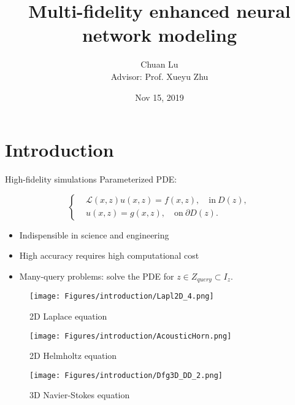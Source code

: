 \documentclass[10pt]{beamer}
\title{Multi-fidelity enhanced neural network modeling }
\date{Nov 15, 2019}
\author[Chuan Lu]{Chuan Lu \\[5pt]
Advisor: Prof. Xueyu Zhu}
\institute[AMCS]{Applied Mathematical and Computational Sciences, University of Iowa}
\begin{document}
\maketitle


\begin{frame}
\tableofcontents
\end{frame}

\section{Introduction}

\begin{frame}{High-fidelity simulations}
Parameterized PDE:
\nocite{maday2006reduced}
\nocite{hesthaven2018non}
\nocite{zhu2014computational}
\nocite{lu2019bifidelity}

$$
\left\{
\begin{aligned}
&\mathcal{L}(x, z)u(x, z) = f(x, z), \quad \text{in}\ D(z), \\ 
&u(x, z) = g(x, z), \quad \text{on}\ \partial D(z).
\end{aligned}
\right.
$$
\begin{itemize}
	\item Indispensible in science and engineering
	\item High accuracy requires high computational cost
	\item Many-query problems: solve the PDE for $z \in Z_{query} \subset I_{z} $.
\end{itemize}


\begin{figure}
\centering
  \begin{minipage}[t]{0.32\textwidth}
    \texttt{[image: Figures/introduction/Lapl2D\_4.png]}
    \footnotemark[1]
    \caption{2D Laplace equation}
  \end{minipage}
  \begin{minipage}[t]{0.32\textwidth}
    \texttt{[image: Figures/introduction/AcousticHorn.png]}
    \footnotemark[1]
    \caption{2D Helmholtz equation}
  \end{minipage}
  \begin{minipage}[t]{0.32\textwidth}
    \texttt{[image: Figures/introduction/Dfg3D\_DD\_2.png]}
    \footnotemark[1]
    \caption{3D Navier-Stokes equation}
  \end{minipage}
\end{figure}
\end{frame}
\end{document}
